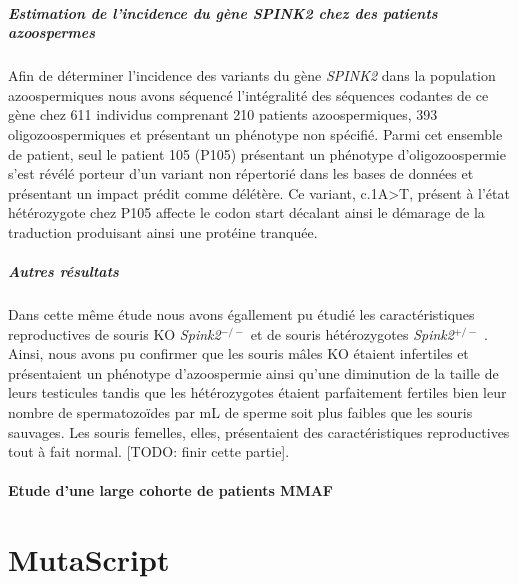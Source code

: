 \documentclass[12pt,twoside]{reedthesis}
\theoremstyle{definition}
\theoremstyle{definition}
\theoremstyle{remark}
\begin{document}
  \paragraph{\texorpdfstring{Estimation de l'incidence du gène
  \emph{SPINK2} chez des patients
  azoospermes}{Estimation de l'incidence du gène SPINK2 chez des patients azoospermes}}\label{estimation-de-lincidence-du-gene-spink2-chez-des-patients-azoospermes}
  
  Afin de déterminer l'incidence des variants du gène \emph{SPINK2} dans
  la population azoospermiques nous avons séquencé l'intégralité des
  séquences codantes de ce gène chez 611 individus comprenant 210 patients
  azoospermiques, 393 oligozoospermiques et présentant un phénotype non
  spécifié. Parmi cet ensemble de patient, seul le patient 105 (P105)
  présentant un phénotype d'oligozoospermie s'est révélé porteur d'un
  variant non répertorié dans les bases de données et présentant un impact
  prédit comme délétère. Ce variant, c.1A\textgreater{}T, présent à l'état
  hétérozygote chez P105 affecte le codon start décalant ainsi le démarage
  de la traduction produisant ainsi une protéine tranquée.
  
  \paragraph{Autres résultats}\label{autres-resultats}
  
  Dans cette même étude nous avons égallement pu étudié les
  caractéristiques reproductives de souris KO \emph{Spink2}\(^{-/-}\) et
  de souris hétérozygotes \emph{Spink2}\(^{+/-}\) . Ainsi, nous avons pu
  confirmer que les souris mâles KO étaient infertiles et présentaient un
  phénotype d'azoospermie ainsi qu'une diminution de la taille de leurs
  testicules tandis que les hétérozygotes étaient parfaitement fertiles
  bien leur nombre de spermatozoïdes par mL de sperme soit plus faibles
  que les souris sauvages. Les souris femelles, elles, présentaient des
  caractéristiques reproductives tout à fait normal. {[}TODO: finir cette
  partie{]}.
  
  \newpage  
  
  \hypertarget{cohortemmah}{\subsubsection{Etude d'une large cohorte de
  patients MMAF}\label{cohortemmah}}
  
  \chapter{MutaScript}\label{mutascript}
  
\end{document}
